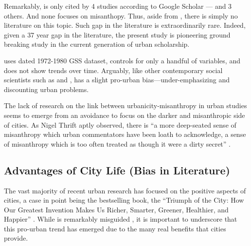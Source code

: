 \documentclass[11pt, letterpaper]{article}
\begin{document}
\begin{spacing}{1.4}
 Remarkably, \citet{wilson85} is only cited by 4 studies according to Google Scholar
---\citet{smith97} and 3 others.  And none 
 focuses on misanthopy. Thus, aside from \citet{wilson85}, there is simply no literature
 on this topic. Such gap in the literature is extraordinarily rare. Indeed,
 given a 37 year gap in the literature, the present study is pioneering ground
 breaking study in the current generation of urban scholarship.

\citet{wilson85} uses dated 1972-1980 GSS dataset, controls for only a
handful of variables, and does not show trends over time.  Arguably, like other contemporary social scientists such as \citet[][]{veenhoven94,meyer13} and \citet[][]{fischer82}, \citeauthor{wilson85} has a slight pro-urban bias---under-emphasizing and discounting urban problems. 

The lack of research on the link between urbanicity-misanthropy in urban studies
seems to emerge from an avoidance to focus on the darker and misanthropic side
of cities. As Nigel Thrift aptly observed, there is ``a more deep-seated sense of misanthropy which urban commentators have been loath to acknowledge, a sense of misanthropy which is too often treated as though it were a dirty secret'' \citep[p. 134]{thrift05}. 

\subsection*{Advantages of City Life (Bias in Literature)}    
    
The vast majority of recent urban research has focused on the positive aspects
of cities, a case in point being the bestselling book, the ``Triumph of the
City: How Our Greatest Invention Makes Us Richer, Smarter, Greener, Healthier,
and Happier'' \citep{glaeser11}. While \citet{glaeser11} is remarkably misguided
\citep{aokCityBook15,peck16}, it is important to underscore that this pro-urban
trend has emerged due to the many real benefits that cities provide. 
   

\end{spacing}
\end{document}
